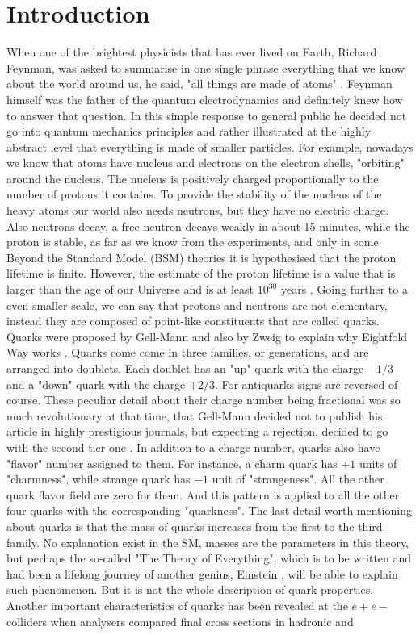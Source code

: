 \chapter{Introduction}
\label{ch:intro}

When one of the brightest physicists that has ever lived on Earth, Richard Feynman, was asked to summarise in one single phrase everything that we know about the world around us, he said, "all things are made of atoms" \cite{Feynman_atoms}. Feynman himself was the father of the quantum electrodynamics and definitely knew how to answer that question. In this simple response to general public he decided not go into quantum mechanics principles and rather illustrated at the highly abstract level that everything is made of smaller particles. For example, nowadays we know that atoms have nucleus and electrons on the electron shells, "orbiting" around the nucleus. The nucleus is positively charged proportionally to the number of protons it contains. To provide the stability of the nucleus of the heavy atoms our world also needs neutrons, but they have no electric charge. Also neutrons decay, a free neutron decays weakly in about 15 minutes, while the proton is stable, as far as we know from the experiments, and only in some Beyond the Standard Model (BSM) theories it is hypothesised that the proton lifetime is finite. However, the estimate of the proton lifetime is a value that is larger than the age of our Universe and is at least $10^{30}$ years \cite{DIMOPOULOS1982133}. Going further to a even smaller scale, we can say that protons and neutrons are not elementary, instead they are composed of point-like constituents that are called quarks. Quarks were proposed by Gell-Mann and also by Zweig to explain why Eightfold Way works  \cite{griffiths_hep}. Quarks come come in three families, or generations, and are arranged into doublets. Each doublet has an "up" quark with the charge $-1/3$ and a "down" quark with the charge $+2/3$. For antiquarks signs are reversed of course. These peculiar detail about their charge number being fractional was so much revolutionary at that time, that Gell-Mann decided not to publish his article in highly prestigious journals, but expecting a rejection, decided to go with the second tier one \cite{griffiths_hep}. In addition to a charge number, quarks also have "flavor" number assigned to them. For instance, a charm quark has $+1$ units of "charmness", while strange quark has $-1$ unit of "strangeness". All the other quark flavor field are zero for them. And this pattern is applied to all the other four quarks with the corresponding "quarkness". The last detail worth mentioning about quarks is that the mass of quarks increases from the first to the third family. No explanation exist in the SM, masses are the parameters in this theory, but perhaps the so-called "The Theory of Everything", which is to be written and had been a lifelong journey of another genius, Einstein \cite{aps_einstein}, will be able to explain such phenomenon. But it is not the whole description of quark properties. Another important characteristics of quarks has been revealed at the $e+e-$ colliders when analysers compared final cross sections in hadronic and 